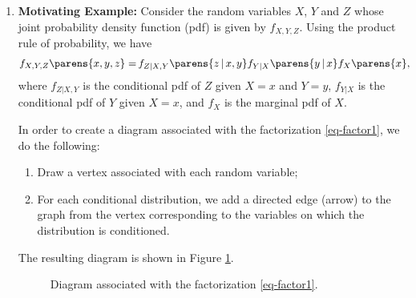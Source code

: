 \documentclass[12pt]{article}
\begin{document}
\begin{enumerate}[label=\textbf{\arabic*.}]

	\item \textbf{Motivating Example:} Consider the random variables $X$, $Y$ and $Z$ whose joint probability density function (pdf) is given by $f_{X,Y,Z}$. Using the product rule of probability, we have 
	\begin{align}
		f_{X,Y,Z} \parens{x, y, z} %
		= & \, f_{Z\vert X,Y} \parens{z \,\vert\, x, y} f_{Y \vert X} \parens{y \,\vert\, x} f_{X} \parens{x}, \label{eq-factor1}
	\end{align}
	where $f_{Z \vert X,Y}$ is the conditional pdf of $Z$ given $X = x$ and $Y = y$, $f_{Y \vert X}$ is the conditional pdf of $Y$ given $X = x$, and $f_X$ is the marginal pdf of $X$. 
	
	In order to create a diagram associated with the factorization \eqref{eq-factor1}, we do the following: 
	\begin{enumerate}
		\item Draw a vertex associated with each random variable; 
		\item For each conditional distribution, we add a directed edge (arrow) to the graph from the vertex corresponding to the variables on which the distribution is conditioned. 
	\end{enumerate}
	The resulting diagram is shown in Figure \ref{fig-factorization-1}. 
	\begin{figure}[h]
		\centering
		\captionsetup{width=.7\linewidth}
		\caption{Diagram associated with the factorization \eqref{eq-factor1}.}
		\label{fig-factorization-1}
	\end{figure}
	

\end{enumerate}
\end{document}
